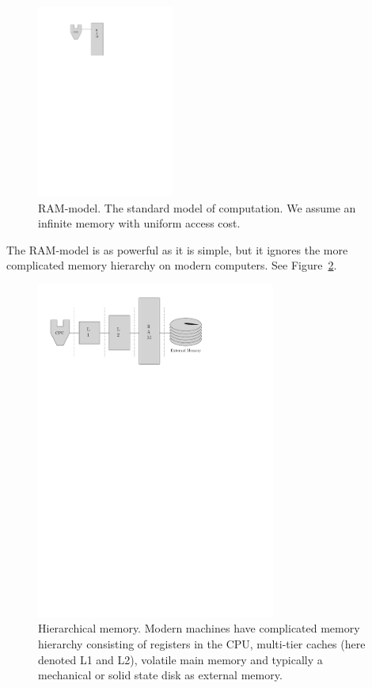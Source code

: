 \documentclass[twoside,11pt,openright]{report}
\begin{document}
\begin{figure}
	\centering
		\includegraphics[width=0.4\textwidth]{../figures/ram_model}
	\caption{RAM-model. The standard model of computation. We assume an infinite memory with uniform access cost.}
	\label{fig:ram_model}
\end{figure}

The RAM-model is as powerful as it is simple, but it ignores the more complicated memory hierarchy on modern computers. See Figure~\ref{fig:real_computer}. 

\begin{figure}
	\centering
		\includegraphics[width=0.7\textwidth]{../figures/real_computer}
	\caption{Hierarchical memory. Modern machines have complicated memory hierarchy consisting of registers in the CPU, multi-tier caches (here denoted L1 and L2), volatile main memory and typically a mechanical or solid state disk as external memory.}
	\label{fig:real_computer}
\end{figure}
\end{document}
